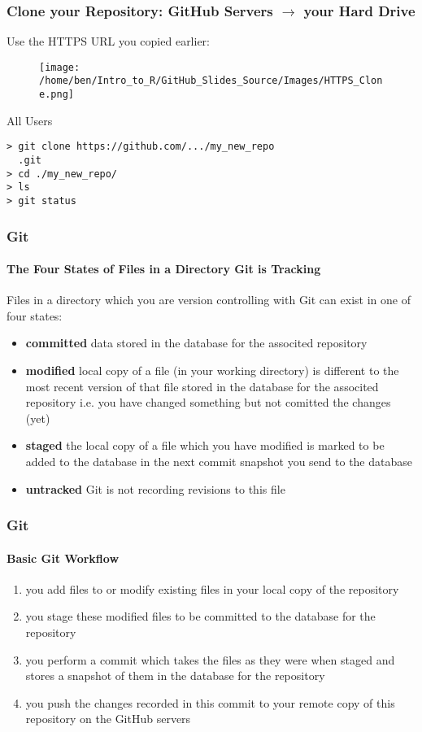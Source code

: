 \documentclass[xcolor=dvipsnames]{beamer}
\begin{document}
\begin{frame}[fragile]
\frametitle{Clone your Repository: GitHub Servers $\rightarrow$ your Hard Drive}
Use the HTTPS URL you copied earlier:\\
\begin{center}
\begin{figure}
\texttt{[image: /home/ben/Intro\_to\_R/GitHub\_Slides\_Source/Images/HTTPS\_Clone.png]}
\end{figure}
\end{center}

\begin{block}{All Users}
\begin{lstlisting}
> git clone https://github.com/.../my_new_repo
  .git
> cd ./my_new_repo/
> ls
> git status
\end{lstlisting}
\end{block}
\end{frame}

\begin{frame} 
\frametitle{Git}
\framesubtitle{The Four States of Files in a Directory Git is Tracking}
Files in a directory which you are version controlling with Git can exist in one of four states:
\begin{itemize}
\item \textbf{committed} data stored in the database for the associted repository
\item \textbf{modified} local copy of a file (in your working directory) is different to the most recent version of that file stored in the database for the associted repository i.e. you have changed something but not comitted the changes (yet)
\item \textbf{staged} the local copy of a file which you have modified is marked to be added to the database in the next commit snapshot you send to the database
\item \textbf{untracked} Git is not recording revisions to this file 
\end{itemize}
\end{frame}

\begin{frame} 
\frametitle{Git}
\framesubtitle{Basic Git Workflow}
\begin{enumerate}
\item you add files to or modify existing files in your local copy of the repository
\newline
\item you stage these modified files to be committed to the database for the repository
\newline
\item you perform a commit which takes the files as they were when staged and stores a snapshot of them in the database for the repository
\newline
\item you push the changes recorded in this commit to your remote copy of this repository on the GitHub servers
\end{enumerate}
\end{frame}
\end{document}
